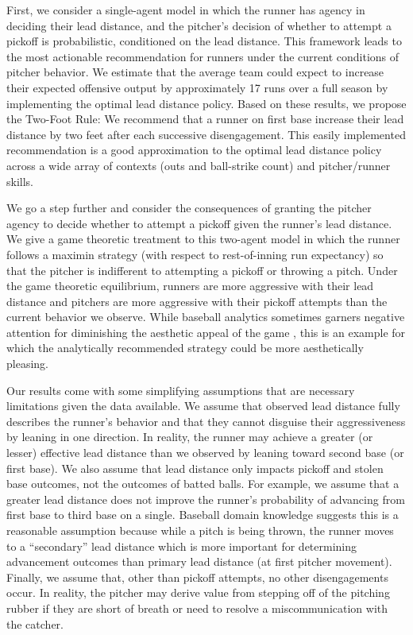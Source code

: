 \documentclass{article}
\begin{document}
    First, we consider a single-agent model in which the runner has agency in deciding their lead distance, and the pitcher's decision of whether to attempt a pickoff is probabilistic, conditioned on the lead distance. This framework leads to the most actionable recommendation for runners under the current conditions of pitcher behavior. We estimate that the average team could expect to increase their expected offensive output by approximately 17 runs over a full season by implementing the optimal lead distance policy. Based on these results, we propose the Two-Foot Rule: We recommend that a runner on first base increase their lead distance by two feet after each successive disengagement. This easily implemented recommendation is a good approximation to the optimal lead distance policy across a wide array of contexts (outs and ball-strike count) and pitcher/runner skills.

    We go a step further and consider the consequences of granting the pitcher agency to decide whether to attempt a pickoff given the runner's lead distance. We give a game theoretic treatment to this two-agent model in which the runner follows a maximin strategy (with respect to rest-of-inning run expectancy) so that the pitcher is indifferent to attempting a pickoff or throwing a pitch. Under the game theoretic equilibrium, runners are more aggressive with their lead distance and pitchers are more aggressive with their pickoff attempts than the current behavior we observe. While baseball analytics sometimes garners negative attention for diminishing the aesthetic appeal of the game \parencite{sheinin_analytics_2025}, this is an example for which the analytically recommended strategy could be more aesthetically pleasing.

    Our results come with some simplifying assumptions that are necessary limitations given the data available. We assume that observed lead distance fully describes the runner's behavior and that they cannot disguise their aggressiveness by leaning in one direction. In reality, the runner may achieve a greater (or lesser) effective lead distance than we observed by leaning toward second base (or first base). We also assume that lead distance only impacts pickoff and stolen base outcomes, not the outcomes of batted balls. For example, we assume that a greater lead distance does not improve the runner's probability of advancing from first base to third base on a single. Baseball domain knowledge suggests this is a reasonable assumption because while a pitch is being thrown, the runner moves to a ``secondary'' lead distance which is more important for determining advancement outcomes than primary lead distance (at first pitcher movement). Finally, we assume that, other than pickoff attempts, no other disengagements occur. In reality, the pitcher may derive value from stepping off of the pitching rubber if they are short of breath or need to resolve a miscommunication with the catcher.
\end{document}
